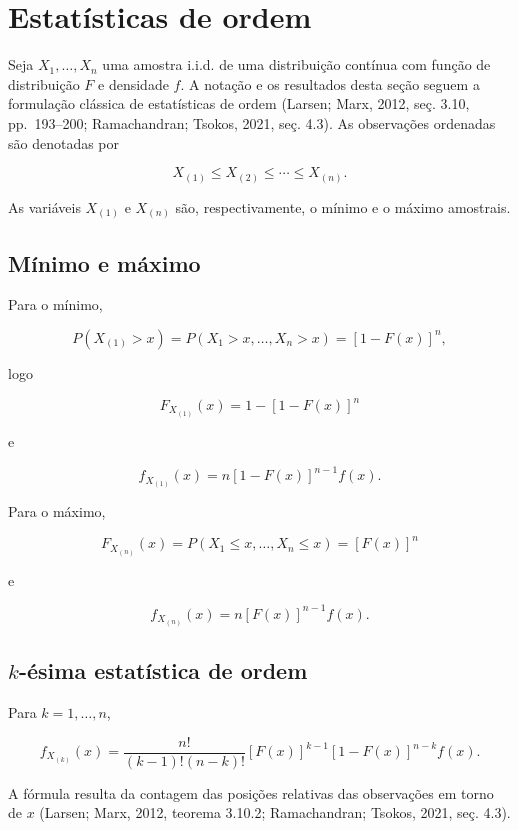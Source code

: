 \documentclass[
  letterpaper,
  DIV=11,
  numbers=noendperiod]{scrreprt}
\begin{document}
\section{Estatísticas de ordem}\label{estatuxedsticas-de-ordem}

Seja \(X_1,\ldots,X_n\) uma amostra i.i.d. de uma distribuição contínua
com função de distribuição \(F\) e densidade \(f\). A notação e os
resultados desta seção seguem a formulação clássica de estatísticas de
ordem (Larsen; Marx, 2012, seç. 3.10, pp.~193--200; Ramachandran;
Tsokos, 2021, seç. 4.3). As observações ordenadas são denotadas por

\[X_{(1)}\leq X_{(2)}\leq\cdots\leq X_{(n)}.\]

As variáveis \(X_{(1)}\) e \(X_{(n)}\) são, respectivamente, o mínimo e
o máximo amostrais.

\subsection{Mínimo e máximo}\label{muxednimo-e-muxe1ximo}

Para o mínimo,

\[P(X_{(1)}>x)
=
P(X_1>x,\ldots,X_n>x)
=
[1-F(x)]^n,\]

logo

\[F_{X_{(1)}}(x)
=
1-[1-F(x)]^n\]

e

\[f_{X_{(1)}}(x)
=
n[1-F(x)]^{n-1}f(x).\]

Para o máximo,

\[F_{X_{(n)}}(x)
=
P(X_1\leq x,\ldots,X_n\leq x)
=
[F(x)]^n\]

e

\[f_{X_{(n)}}(x)
=
n[F(x)]^{n-1}f(x).\]

\subsection{\texorpdfstring{\(k\)-ésima estatística de
ordem}{k-ésima estatística de ordem}}\label{k-uxe9sima-estatuxedstica-de-ordem}

\begin{tcolorbox}[enhanced jigsaw, colback=white, leftrule=.75mm, colbacktitle=quarto-callout-important-color!10!white, breakable, titlerule=0mm, bottomtitle=1mm, title=\textcolor{quarto-callout-important-color}{\faExclamation}\hspace{0.5em}{Teorema --- Densidade de \(X_{(k)}\)}, colframe=quarto-callout-important-color-frame, toprule=.15mm, opacityback=0, bottomrule=.15mm, opacitybacktitle=0.6, arc=.35mm, toptitle=1mm, rightrule=.15mm, coltitle=black, left=2mm]

Para \(k=1,\ldots,n\),

\[f_{X_{(k)}}(x)
=
\frac{n!}{(k-1)!(n-k)!}
[F(x)]^{k-1}[1-F(x)]^{n-k}f(x).\]

A fórmula resulta da contagem das posições relativas das observações em
torno de \(x\) (Larsen; Marx, 2012, teorema 3.10.2; Ramachandran;
Tsokos, 2021, seç. 4.3).

\end{tcolorbox}
\end{document}
